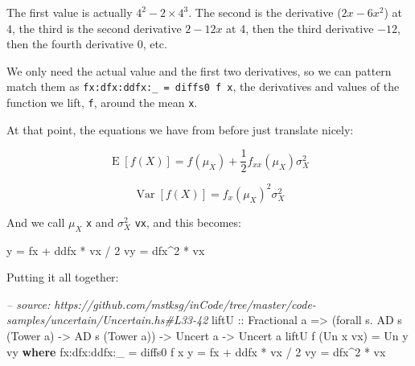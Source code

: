 \documentclass[]{article}
\newenvironment{Shaded}{}{}
\newcommand{\KeywordTok}[1]{\textcolor[rgb]{0.00,0.44,0.13}{\textbf{{#1}}}}
\newcommand{\DataTypeTok}[1]{\textcolor[rgb]{0.56,0.13,0.00}{{#1}}}
\newcommand{\DecValTok}[1]{\textcolor[rgb]{0.25,0.63,0.44}{{#1}}}
\newcommand{\CommentTok}[1]{\textcolor[rgb]{0.38,0.63,0.69}{\textit{{#1}}}}
\newcommand{\OtherTok}[1]{\textcolor[rgb]{0.00,0.44,0.13}{{#1}}}
\newcommand{\FunctionTok}[1]{\textcolor[rgb]{0.02,0.16,0.49}{{#1}}}
\newcommand{\NormalTok}[1]{{#1}}
\begin{document}
The first value is actually \(4^2 - 2 \times 4^3\). The second is the
derivative (\(2 x - 6x^2\)) at 4, the third is the second derivative
\(2 - 12 x\) at 4, then the third derivative \(-12\), then the fourth
derivative \(0\), etc.

We only need the actual value and the first two derivatives, so we can
pattern match them as \texttt{fx:dfx:ddfx:\_\ =\ diffs0\ f\ x}, the
derivatives and values of the function we lift, \texttt{f}, around the
mean \texttt{x}.

At that point, the equations we have from before just translate nicely:

\[\operatorname{E}[f(X)] = f(\mu_X) + \frac{1}{2} f_{xx}(\mu_X) \sigma_X^2\]

\[\operatorname{Var}[f(X)] = f_x(\mu_X)^2 \sigma_X^2\]

And we call \(\mu_X\) \texttt{x} and \(\sigma_X^2\) \texttt{vx}, and
this becomes:

\begin{Shaded}
\begin{Highlighting}[]
\NormalTok{y  }\FunctionTok{=} \NormalTok{fx }\FunctionTok{+} \NormalTok{ddfx }\FunctionTok{*} \NormalTok{vx }\FunctionTok{/} \DecValTok{2}
\NormalTok{vy }\FunctionTok{=} \NormalTok{dfx}\FunctionTok{^}\DecValTok{2} \FunctionTok{*} \NormalTok{vx}
\end{Highlighting}
\end{Shaded}

Putting it all together:

\begin{Shaded}
\begin{Highlighting}[]
\CommentTok{-- source: https://github.com/mstksg/inCode/tree/master/code-samples/uncertain/Uncertain.hs#L33-42}
\NormalTok{liftU}
\OtherTok{    ::} \DataTypeTok{Fractional} \NormalTok{a}
    \OtherTok{=>} \NormalTok{(forall s}\FunctionTok{.} \DataTypeTok{AD} \NormalTok{s (}\DataTypeTok{Tower} \NormalTok{a) }\OtherTok{->} \DataTypeTok{AD} \NormalTok{s (}\DataTypeTok{Tower} \NormalTok{a))}
    \OtherTok{->} \DataTypeTok{Uncert} \NormalTok{a}
    \OtherTok{->} \DataTypeTok{Uncert} \NormalTok{a}
\NormalTok{liftU f (}\DataTypeTok{Un} \NormalTok{x vx) }\FunctionTok{=} \DataTypeTok{Un} \NormalTok{y vy}
  \KeywordTok{where}
    \NormalTok{fx}\FunctionTok{:}\NormalTok{dfx}\FunctionTok{:}\NormalTok{ddfx}\FunctionTok{:}\NormalTok{_ }\FunctionTok{=} \NormalTok{diffs0 f x}
    \NormalTok{y             }\FunctionTok{=} \NormalTok{fx }\FunctionTok{+} \NormalTok{ddfx }\FunctionTok{*} \NormalTok{vx }\FunctionTok{/} \DecValTok{2}
    \NormalTok{vy            }\FunctionTok{=} \NormalTok{dfx}\FunctionTok{^}\DecValTok{2} \FunctionTok{*} \NormalTok{vx}
\end{Highlighting}
\end{Shaded}
\end{document}
